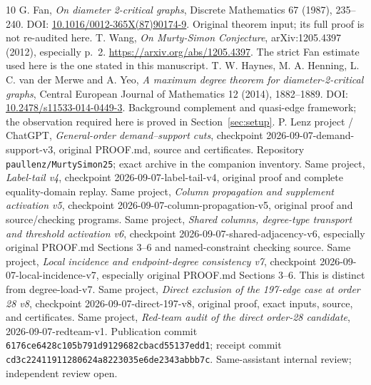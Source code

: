 \documentclass[11pt,a4paper]{article}
\begin{document}
\begin{thebibliography}{10}\small\setlength{\itemsep}{2pt}
 G. Fan, \emph{On diameter 2-critical graphs}, Discrete Mathematics 67 (1987), 235--240. DOI: \href{https://doi.org/10.1016/0012-365X(87)90174-9}{10.1016/0012-365X(87)90174-9}. Original theorem input; its full proof is not re-audited here.
 T. Wang, \emph{On Murty-Simon Conjecture}, arXiv:1205.4397 (2012), especially p.~2. \url{https://arxiv.org/abs/1205.4397}. The strict Fan estimate used here is the one stated in this manuscript.
 T. W. Haynes, M. A. Henning, L. C. van der Merwe and A. Yeo, \emph{A maximum degree theorem for diameter-2-critical graphs}, Central European Journal of Mathematics 12 (2014), 1882--1889. DOI: \href{https://doi.org/10.2478/s11533-014-0449-3}{10.2478/s11533-014-0449-3}. Background complement and quasi-edge framework; the observation required here is proved in Section~\ref{sec:setup}.
 P. Lenz project / ChatGPT, \emph{General-order demand--support cuts}, checkpoint 2026-09-07-demand-support-v3, original PROOF.md, source and certificates. Repository \texttt{paullenz/MurtySimon25}; exact archive in the companion inventory.
 Same project, \emph{Label-tail v4}, checkpoint 2026-09-07-label-tail-v4, original proof and complete equality-domain replay.
 Same project, \emph{Column propagation and supplement activation v5}, checkpoint 2026-09-07-column-propagation-v5, original proof and source/checking programs.
 Same project, \emph{Shared columns, degree-type transport and threshold activation v6}, checkpoint 2026-09-07-shared-adjacency-v6, especially original PROOF.md Sections 3--6 and named-constraint checking source.
 Same project, \emph{Local incidence and endpoint-degree consistency v7}, checkpoint 2026-09-07-local-incidence-v7, especially original PROOF.md Sections 3--6. This is distinct from degree-load-v7.
 Same project, \emph{Direct exclusion of the 197-edge case at order 28 v8}, checkpoint 2026-09-07-direct-197-v8, original proof, exact inputs, source, and certificates.
 Same project, \emph{Red-team audit of the direct order-28 candidate}, 2026-09-07-redteam-v1. Publication commit \texttt{6176ce6428c105b791d9129682cbacd55137edd1}; receipt commit \texttt{cd3c22411911280624a8223035e6de2343abbb7c}. Same-assistant internal review; independent review open.
\end{thebibliography}
\end{document}
